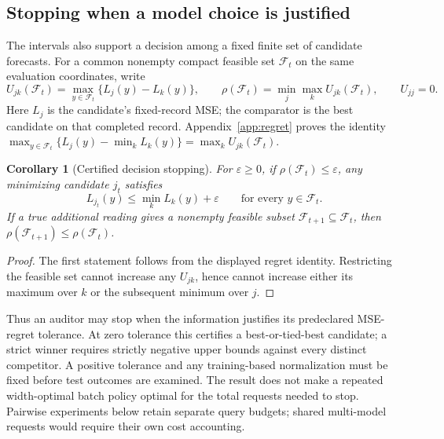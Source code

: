\documentclass[12pt]{article}
\newtheorem{corollary}{Corollary}
\newcommand{\F}{\mathcal{F}}
\begin{document}
\subsection{Stopping when a model choice is justified}\label{sec:decision-stopping}
The intervals also support a decision among a fixed finite set of candidate
forecasts. For a common nonempty compact feasible set $\F_t$ on the same
evaluation coordinates, write
\[
 U_{jk}(\F_t)=\max_{y\in\F_t}\{L_j(y)-L_k(y)\},\qquad
 \rho(\F_t)=\min_j\max_k U_{jk}(\F_t),\qquad U_{jj}=0.
\]
Here $L_j$ is the candidate's fixed-record MSE; the comparator is the best
candidate on that completed record. Appendix~\ref{app:regret} proves the
identity $\max_{y\in\F_t}\{L_j(y)-\min_kL_k(y)\}=\max_kU_{jk}(\F_t)$.
\begin{corollary}[Certified decision stopping]\label{cor:decision-stopping}
For $\varepsilon\geq0$, if $\rho(\F_t)\leq\varepsilon$, any minimizing
candidate $j_t$ satisfies
\[
 L_{j_t}(y)\leq\min_k L_k(y)+\varepsilon\qquad\text{for every }y\in\F_t.
\]
If a true additional reading gives a nonempty feasible subset
$\F_{t+1}\subseteq\F_t$, then $\rho(\F_{t+1})\leq\rho(\F_t)$.
\end{corollary}
\begin{proof}
The first statement follows from the displayed regret identity. Restricting
the feasible set cannot increase any $U_{jk}$, hence cannot increase either
its maximum over $k$ or the subsequent minimum over $j$.
\end{proof}
Thus an auditor may stop when the information justifies its predeclared
MSE-regret tolerance. At zero tolerance this certifies a best-or-tied-best
candidate; a strict winner requires strictly negative upper bounds against
every distinct competitor. A positive tolerance and any training-based
normalization must be fixed before test outcomes are examined. The result
does not make a repeated width-optimal batch policy optimal for the total
requests needed to stop. Pairwise experiments below retain separate query
budgets; shared multi-model requests would require their own cost accounting.
\end{document}
